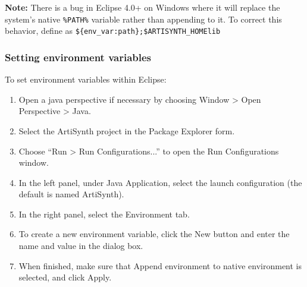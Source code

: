 \ifWindows
\begin{sideblock}
{\bf Note:} There is a bug in Eclipse 4.0+ on Windows where it will replace 
the system's native {\tt \%PATH\%} variable rather than appending to it.  
To correct this behavior, define \PATH{} as 
{\tt \$\{env\_var:path\};\$ARTISYNTH\_HOME\SEP lib\SEP \ARCH{}} 
\end{sideblock}
\fi %
\fi

\subsubsection {Setting environment variables}
\label{SettingEnvironmentVariables}

To set environment variables within Eclipse:

\begin{enumerate}

\item Open a java perspective if necessary by choosing
  {\sf Window > Open Perspective > Java}.

\item Select the ArtiSynth project in the {\sf Package Explorer} form.

\item Choose ``{\sf Run > Run Configurations...}'' to open the {\sf Run
  Configurations} window.

\item In the left panel, under {\sf Java Application}, select 
the launch configuration (the default is named {\sf ArtiSynth}).

\item In the right panel, select the {\sf Environment} tab.

\item To create a new environment variable, click the {\sf New} button and
  enter the name and value in the dialog box. 

\item When finished, make sure that {\sf Append environment to native
  environment} is selected, and click {\sf Apply}.

\end{enumerate}


